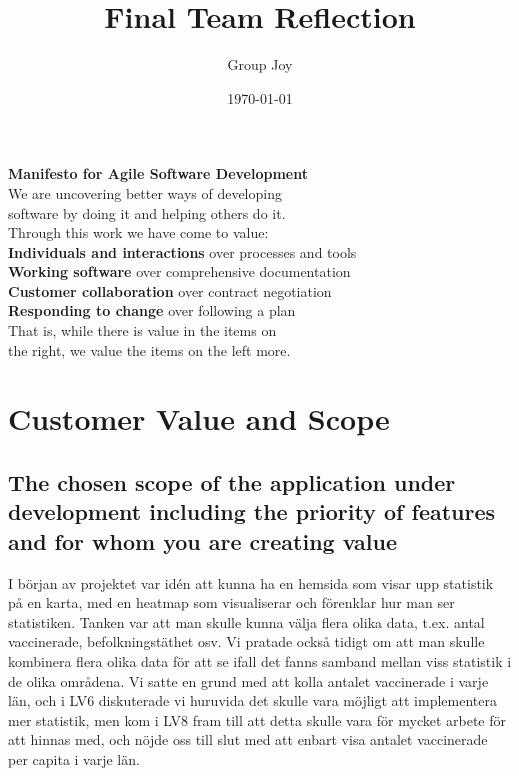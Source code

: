 \documentclass{scrartcl}
\begin{document}
\title{Final Team Reflection}
\author{Group Joy}
\date{\today}
\maketitle
\newpage
\begin{center}
\vspace*{\fill}
{\LARGE \textbf{Manifesto for Agile Software Development}}\\
\bigskip We are uncovering better ways of developing\\
software by doing it and helping others do it.\\
Through this work we have come to value:\\
\medskip
\textbf{{\large Individuals and interactions}} over processes and tools\\
\textbf{{\large Working software}} over comprehensive documentation\\
\textbf{{\large Customer collaboration}} over contract negotiation\\
\textbf{{\large Responding to change}} over following a plan\\
\medskip
That is, while there is value in the items on\\
the right, we value the items on the left more.\cite{manifesto}
\vspace*{\fill}
\end{center}

\newpage


\section{Customer Value and Scope}
\subsection{The chosen scope of the application under development including the priority of features and for whom you are creating value}
%
I början av projektet var idén att kunna ha en hemsida som visar upp statistik på en karta, med en heatmap som visualiserar och förenklar hur man ser statistiken. Tanken var att man skulle kunna välja flera olika data, t.ex. antal vaccinerade, befolkningstäthet osv. Vi pratade också tidigt om att man skulle kombinera flera olika data för att se ifall det fanns samband mellan viss statistik i de olika områdena. Vi satte en grund med att kolla antalet vaccinerade i varje län, och i LV6 diskuterade vi huruvida det skulle vara möjligt att implementera mer statistik, men kom i LV8 fram till att detta skulle vara för mycket arbete för att hinnas med, och nöjde oss till slut med att enbart visa antalet vaccinerade per capita i varje län.
\end{document}
